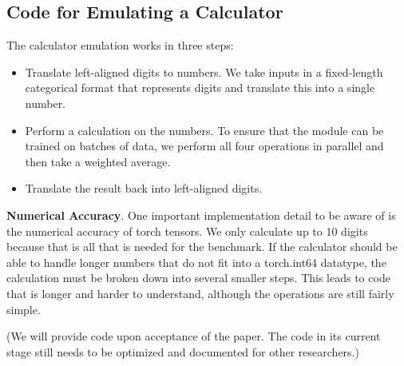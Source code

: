\documentclass[11pt]{article}
\begin{document}
\subsection{Code for Emulating a Calculator}
\label{appendix-code-emulator}



The calculator emulation works in three steps:
\begin{itemize}
    \item Translate left-aligned digits to numbers. We take inputs in a fixed-length categorical format that represents digits and translate this into a single number.
    \item Perform a calculation on the numbers. To ensure that the module can be trained on batches of data, we perform all four operations in parallel and then take a weighted average.
    \item Translate the result back into left-aligned digits.
\end{itemize}

\textbf{Numerical Accuracy}.
One important implementation detail to be aware of is the numerical accuracy of torch tensors. We only calculate up to 10 digits because that is all that is needed for the benchmark. If the calculator should be able to handle longer numbers that do not fit into a torch.int64 datatype, the calculation must be broken down into several smaller steps. This leads to code that is longer and harder to understand, although the operations are still fairly simple.

(We will provide code upon acceptance of the paper. The code in its current stage still needs to be optimized and documented for other researchers.)

\end{document}
